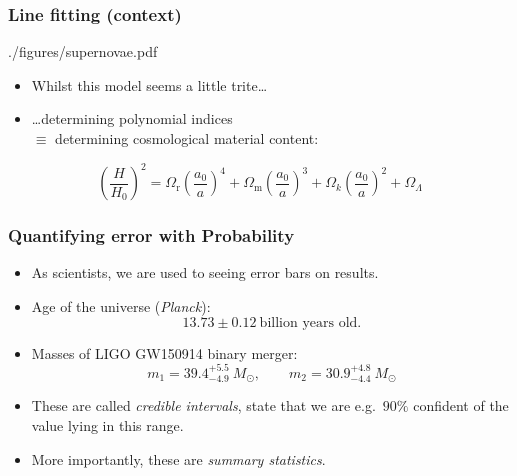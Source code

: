 \documentclass[%
]{beamer}
\begin{document}
\begin{frame}
    \frametitle{Line fitting (context)}
    \begin{figright}[0.5]{./figures/supernovae.pdf}
        \begin{itemize}
            \item Whilst this model seems a little trite\ldots
            \item\ldots determining polynomial indices \\$\equiv$ determining cosmological material content:
        \end{itemize}
    \end{figright}
        \[
            {\left( \frac{H}{H_0} \right)}^2 = 
            \Omega_\text{r} {\left( \frac{a_0}{a} \right)}^4+
            \Omega_\text{m} {\left( \frac{a_0}{a} \right)}^3+
            \Omega_k {\left( \frac{a_0}{a} \right)}^2+
            \Omega_\Lambda
            \]
\end{frame}



\begin{frame}
    \frametitle{Quantifying error with Probability}

    \begin{itemize}
        \item As scientists, we are used to seeing error bars on results.
        \item Age of the universe ({\em Planck\/}): 
         \[13.73\pm 0.12\:\text{billion years old.}\]
        \item Masses of LIGO GW150914 binary merger: 
        \[m_1 = 39.4^{+5.5}_{-4.9}\:M_\odot,\qquad m_2 = 30.9^{+4.8}_{-4.4}\:M_\odot \]
        \item These are called {\em credible intervals}, state that we are e.g.\ $90\%$ confident of the value lying in this range.
        \item More importantly, these are {\em summary statistics}.
    \end{itemize}
\end{frame}
\end{document}
